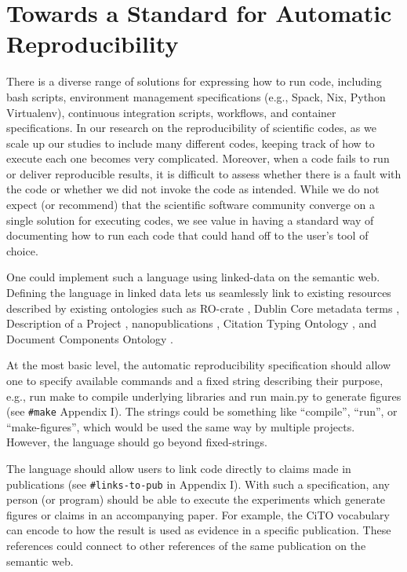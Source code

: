 \documentclass[manuscript,authordraft]{acmart}
\begin{document}
\hypertarget{towards-a-standard-for-automatic-reproducibility}{%
\section{Towards a Standard for Automatic
Reproducibility}\label{towards-a-standard-for-automatic-reproducibility}}

There is a diverse range of solutions for expressing how to run code,
including bash scripts, environment management specifications (e.g.,
Spack, Nix, Python Virtualenv), continuous integration scripts,
workflows, and container specifications. In our research on the
reproducibility of scientific codes, as we scale up our studies to
include many different codes, keeping track of how to execute each one
becomes very complicated. Moreover, when a code fails to run or deliver
reproducible results, it is difficult to assess whether there is a fault
with the code or whether we did not invoke the code as intended. While
we do not expect (or recommend) that the scientific software community
converge on a single solution for executing codes, we see value in
having a standard way of documenting how to run each code that could
hand off to the user's tool of choice.

One could implement such a language using linked-data on the semantic
web. Defining the language in linked data lets us seamlessly link to
existing resources described by existing ontologies such as RO-crate
\cite{soiland-reyes_packaging_2022}, Dublin Core metadata terms
\cite{weibel_dublin_2000}, Description of a Project
\cite{wilder-james_description_2017}, nanopublications
\cite{groth_anatomy_2010}, Citation Typing Ontology
\cite{shotton_cito_2010}, and Document Components Ontology
\cite{constantin_document_2016}.

At the most basic level, the automatic reproducibility specification
should allow one to specify available commands and a fixed string
describing their purpose, e.g., run make to compile underlying libraries
and run main.py to generate figures (see \texttt{\#make} Appendix I).
The strings could be something like ``compile'', ``run'', or
``make-figures'', which would be used the same way by multiple projects.
However, the language should go beyond fixed-strings.

The language should allow users to link code directly to claims made in
publications (see \texttt{\#links-to-pub} in Appendix I). With such a
specification, any person (or program) should be able to execute the
experiments which generate figures or claims in an accompanying paper.
For example, the CiTO vocabulary \cite{shotton_cito_2010} can encode to
how the result is used as evidence in a specific publication. These
references could connect to other references of the same publication on
the semantic web.
\end{document}
